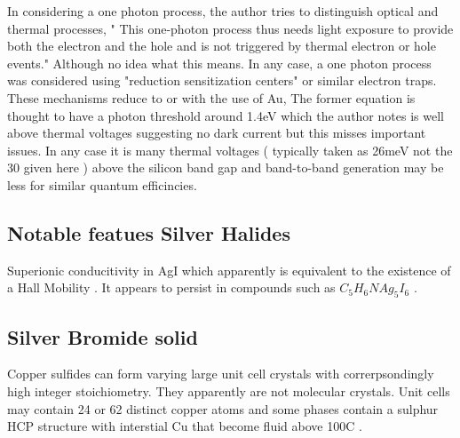 In considering a one photon process, the author tries to distinguish
optical and thermal processes, " This one-photon process thus needs 
light exposure
to provide both the electron and the hole and is not triggered 
by thermal electron or hole events."
Although no idea what this means. In any case, a one photon process
was considered using "reduction sensitization centers" or similar
electron traps. These mechanisms reduce to
or with the use of Au,
The former equation is thought to have a photon threshold around 1.4eV
which the author notes is well above thermal voltages suggesting no
dark current but this misses important issues. In any case it is many
thermal voltages ( typically taken as 26meV not the 30 given here ) 
above the silicon band gap and band-to-band generation may be less
for similar quantum efficincies. 




\subsection{Notable featues Silver Halides} 

Superionic conducitivity in AgI 
\cite{Carvalho_Negi_Neto_Direct_calculation_2022} 
which apparently is equivalent to the  
 existence of a Hall Mobility
\cite{Liou_Hudson_Wonnell_Ionic_Hall_effect_1990}
. It appears to persist
in compounds such as $C_5H_6NAg_5I_6$ \cite{Newman_Frank_Matlack_ionic_hall_effect_1977}.


\subsection{Silver Bromide solid} 





Copper sulfides can form varying large unit cell crystals
with correrpsondingly high integer stoichiometry.
They apparently are not molecular crystals.
Unit cells may contain 24 or 62 distinct copper atoms and some phases
contain a sulphur HCP structure with interstial Cu that become
fluid above 100C \cite{Evans_crystal_structures_}.






